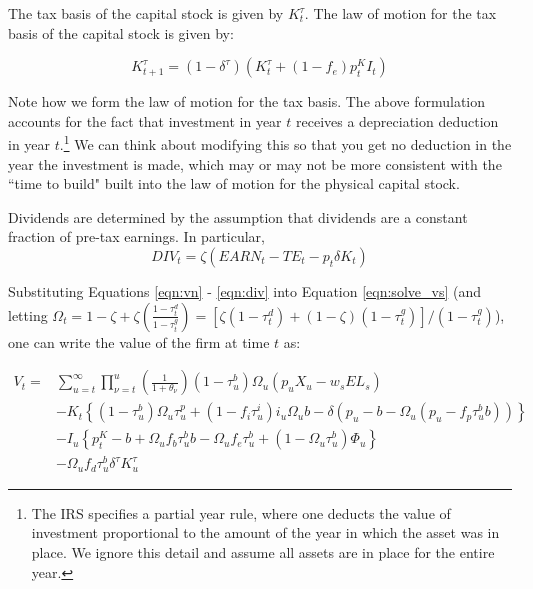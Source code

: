 The tax basis of the capital stock is given by $K^{\tau}_{t}$.  The law of motion for the tax basis of the capital stock is given by:

\begin{equation}
\label{eqn:lom_taxcapital}
K^{\tau}_{t+1}=(1-\delta^{\tau})(K^{\tau}_{t} + (1-f_{e})p^{K}_{t}I_{t})
\end{equation}

\noindent\noindent Note how we form the law of motion for the tax basis.  The above formulation accounts for the fact that investment in year $t$ receives a depreciation deduction in year $t$.\footnote{The IRS specifies a partial year rule, where one deducts the value of investment proportional to the amount of the year in which the asset was in place.  We ignore this detail and assume all assets are in place for the entire year.}  We can think about modifying this so that you get no deduction in the year the investment is made, which may or may not be more consistent with the ``time to build" built into the law of motion for the physical capital stock.

Dividends are determined by the assumption that dividends are a constant fraction of pre-tax earnings.  In particular, 
\begin{equation}
\label{eqn:div}
DIV_{t}=\zeta(EARN_{t}-TE_{t}-p_{t}\delta K_{t})
\end{equation}

Substituting Equations \ref{eqn:vn} - \ref{eqn:div} into Equation \ref{eqn:solve_vs}  (and letting $\Omega_{t}=1 - \zeta + \zeta\left(\frac{1-\tau^{d}_{t}}{1-\tau^{g}_{t}}\right) = \left[\zeta(1-\tau^{d}_{t}) + (1-\zeta)(1-\tau^{g}_{t})\right]/(1-\tau^{g}_{t})$), one can write the value of the firm at time $t$ as:

\begin{equation}
\label{eqn:vs}
\begin{split}
V_{t} = &  \sum_{u=t}^{\infty} \prod_{\nu=t}^{u}\left(\frac{1}{1+\theta_{\nu}}\right) (1-\tau^{b}_{u})\Omega_{u}(p_{u}X_{u}-w_{s}EL_{s})  \\ 
 & - K_{t} \left\{(1-\tau^{b}_{u})\Omega_{u}\tau^{p}_{u}+(1-f_{i}\tau^{i}_{u})i_{u}\Omega_{u}b-\delta(p_{u}-b-\Omega_{u}(p_{u}-f_{p}\tau^{b}_{u}b))\right\}  \\
 & - I_{u}\left\{p^{K}_{t}-b+\Omega_{u}f_{b}\tau^{b}_{u}b-\Omega_{u}f_{e}\tau^{b}_{u} + (1-\Omega_{u}\tau^{b}_{u})\Phi_{u}\right\} \\
 & - \Omega_{u}f_{d}\tau^{b}_{u}\delta^{\tau}K^{\tau}_{u}
\end{split}
\end{equation}

